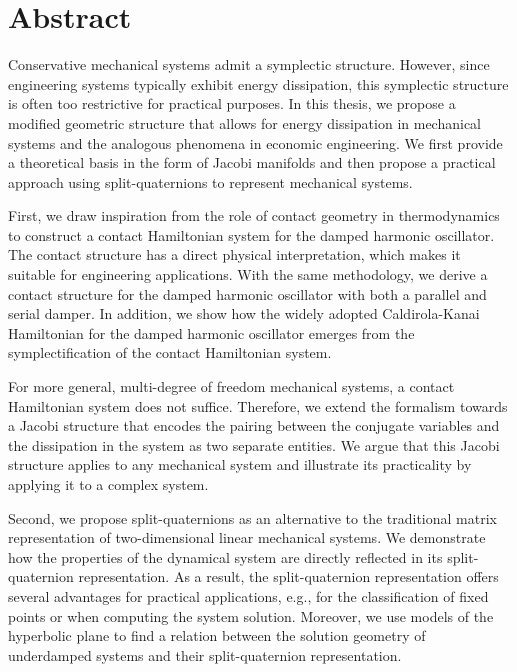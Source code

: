 \chapter*{Abstract}%

Conservative mechanical systems admit a symplectic structure. However, since engineering systems typically exhibit energy dissipation, this symplectic structure is often too restrictive for practical purposes. In this thesis, we propose a modified geometric structure that allows for energy dissipation in mechanical systems and the analogous phenomena in economic engineering. We first provide a theoretical basis in the form of Jacobi manifolds and then propose a practical approach using split-quaternions to represent mechanical systems.

First, we draw inspiration from the role of contact geometry in thermodynamics to construct a contact Hamiltonian system for the damped harmonic oscillator. The contact structure has a direct physical interpretation, which makes it suitable for engineering applications. With the same methodology, we derive a contact structure for the damped harmonic oscillator with both a parallel and serial damper. In addition, we show how the widely adopted Caldirola-Kanai Hamiltonian for the damped harmonic oscillator emerges from the symplectification of the contact Hamiltonian system. 

For more general, multi-degree of freedom mechanical systems, a contact Hamiltonian system does not suffice. Therefore, we extend the formalism towards a Jacobi structure that encodes the pairing between the conjugate variables and the dissipation in the system as two separate entities. We argue that this Jacobi structure applies to any mechanical system and illustrate its practicality by applying it to a complex system.

Second, we propose split-quaternions as an alternative to the traditional matrix representation of two-dimensional linear mechanical systems. We demonstrate how the properties of the dynamical system are directly reflected in its split-quaternion representation. As a result, the split-quaternion representation offers several advantages for practical applications, e.g., for the classification of fixed points or when computing the system solution. Moreover, we use models of the hyperbolic plane to find a relation between the solution geometry of underdamped systems and their split-quaternion representation.
 
 

